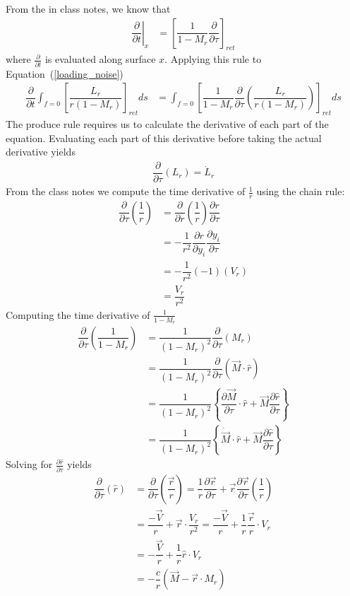 \documentclass[onecolumn,10pt]{jhwhw}
\begin{document}
\solution
From the in class notes, we know that
\begin{align*}
\left. \dfrac{\partial}{\partial t} \right|_x &= \left[ \dfrac{1}{1 - M_r} \dfrac{\partial}{\partial \tau} \right]_{ret}
\end{align*}
where $\frac{\partial}{\partial t}$ is evaluated along surface $x$. Applying this rule to Equation~(\ref{loading_noise})
\begin{align} \label{where_am_i}
\dfrac{\partial}{\partial t} \int_{f=0} \left[ \dfrac{L_r}{r (1 - M_r)} \right]_{ret} ds
&= \int_{f=0} \left[
    \dfrac{1}{1 - M_r} \dfrac{\partial}{\partial \tau}
    \left( \dfrac{L_r}{r   (1 - M_r)}  \right)
    \right]_{ret} ds
\end{align}
The produce rule requires us to calculate the derivative of each part of the equation. Evaluating each part of this derivative before taking the actual derivative yields
\begin{align*}
\dfrac{\partial}{\partial\tau} \left( L_r \right) = \dot{L}_r
\end{align*}
From the class notes we compute the time derivative of $\frac{1}{r}$ using the chain rule:
\begin{align*}
\dfrac{\partial}{\partial\tau} \left( \dfrac{1}{r} \right)
&= \dfrac{\partial}{\partial r} \left( \dfrac{1}{r} \right) \dfrac{\partial r}{\partial\tau} \\
&= -\dfrac{1}{r^2} \dfrac{\partial r}{\partial y_i} \dfrac{\partial y_i}{\partial \tau} \\
&= -\dfrac{1}{r^2} (-1) (V_r) \\
&= \dfrac{V_r}{r^2}
\end{align*}
Computing the time derivative of $\frac{1}{1 - M_r}$
\begin{align}
\dfrac{\partial}{\partial\tau} \left( \dfrac{1}{1 - M_r} \right)
&= \dfrac{1}{(1 - M_r)^2} \dfrac{\partial}{\partial\tau}(M_r) \nonumber \\
&= \dfrac{1}{(1 - M_r)^2} \dfrac{\partial}{\partial\tau} \left( \vec{M} \cdot \hat{r} \right) \nonumber \\
&= \dfrac{1}{(1 - M_r)^2} \left \{ \dfrac{\partial\vec{M}}{\partial\tau} \cdot\hat{r} + \vec{M} \dfrac{\partial\hat{r}}{\partial\tau} \right \} \nonumber \\
&= \dfrac{1}{(1 - M_r)^2} \left \{ \dot{\vec{M}}\cdot\hat{r} + \vec{M} \dfrac{\partial\hat{r}}{\partial\tau} \right \}  \label{yolo2}
\end{align}
Solving for $\frac{\partial\hat{r}}{\partial\tau}$ yields
\begin{align}
\dfrac{\partial}{\partial\tau} \left( \hat{r} \right)
&= \dfrac{\partial}{\partial\tau} \left( \dfrac{\vec{r}}{r} \right)
    = \dfrac{1}{r} \dfrac{\partial \vec{r}}{\partial\tau}
    + \vec{r}\dfrac{\partial\vec{r}}{\partial\tau} \left(\dfrac{1}{r} \right) \nonumber \\
&= \dfrac{-\vec{V}}{r} + \vec{r} \cdot \dfrac{V_r}{r^2}
    = \dfrac{-\vec{V}}{r} + \dfrac{1}{r} \dfrac{\vec{r}}{r} \cdot V_r  \nonumber \\
&= -\dfrac{\vec{V}}{r} + \dfrac{1}{r} \hat{r} \cdot V_r \nonumber \\
&= -\dfrac{c}{r} \left( \vec{M} - \vec{r} \cdot M_r \right) \label{yolo3}
\end{align}
\end{document}
